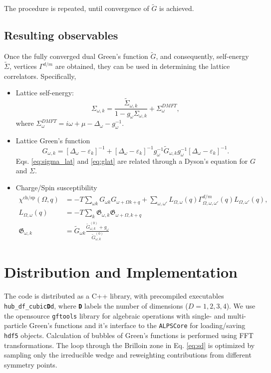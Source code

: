 \documentclass[3p,times,procedia]{elsarticle}
\begin{document}
The procedure is repeated, until convergence of $\tilde G$ is achieved. 

\subsection{Resulting observables}
Once the fully converged dual Green's function $\tilde G$, and consequently, self-energy $\tilde \Sigma$, vertices $\Gamma^{d/m}$ are obtained, they can be used in determining the lattice correlators. Specifically, 
\begin{itemize}
\item Lattice self-energy: 
\begin{equation}\label{eq:sigma_lat}
\Sigma_{\omega, k} = \frac{\tilde \Sigma_{\omega, k}}{1 - g_\omega \Sigma_{\omega, k}} + \Sigma^{DMFT}_{\omega},
\end{equation}
where $\Sigma^{DMFT}_{\omega} = i\omega + \mu - \Delta_{\omega} - g_\omega^{-1}$. 
\item Lattice Green's function
\begin{equation}\label{eq:glat}
G_{\omega,k} = \left[\Delta_{\omega} - \varepsilon_{k}\right]^{-1} + \left[\Delta_{\omega} - \varepsilon_{k}\right]^{-1} g_{\omega}^{-1} \tilde G_{\omega, k} g_{\omega}^{-1} \left[\Delta_{\omega} - \varepsilon_{k}\right]^{-1}.
\end{equation}
Eqs. \ref{eq:sigma_lat} and \ref{eq:glat} are related through a Dyson's equation for $G$ and $\Sigma$. 
\item Charge/Spin susceptibility 
\begin{align}
\chi^{\mathrm{ch/sp}} (\Omega, q) & = -T \sum_{\omega k} G_{\omega k} G_{\omega+\Omega k+q} + \sum_{\omega,\omega'} L_{\Omega, \omega}(q) \Gamma^{d/m}_{\Omega,\omega,\omega'}(q) L_{\Omega, \omega'}(q), \\
L_{\Omega, \omega}(q) & = -T \sum_k \mathfrak{G}_{\omega,k} \mathfrak{G}_{\omega + \Omega,k + q} \\
\mathfrak{G}_{\omega,k} & = \tilde G_{\omega k} \frac{\tilde G^{(0)}_{\omega, k} + g_\omega}{\tilde G^{(0)}_{\omega, k}}
\end{align}
\end{itemize}

\section{Distribution and Implementation}
The code is distributed as a C++ library, with precompiled executables \texttt{hub\_df\_cubic{\bf D}d}, where \texttt{\bf D} labels the number of dimensions ($D=1,2,3,4$). We use the opensource \texttt{gftools} library\cite{gftools} for algebraic operations with single- and multi-particle Green's functions and it's interface to the \texttt{ALPSCore} for loading/saving \texttt{hdf5} objects. Calculation of bubbles of Green's functions is performed using FFT transformations. The loop through the Brilloin zone in Eq. \ref{eq:sd} is optimized by sampling only the irreducible wedge and reweighting contributions from different symmetry points.
\end{document}
